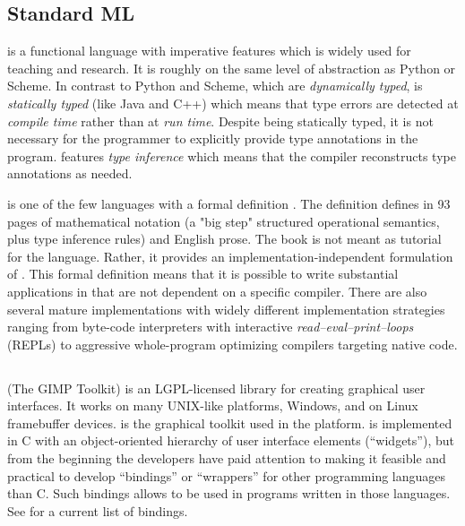 \documentclass[workingdraft]{usetex-v1}
\begin{document}
\subsection{Standard ML}


\sml is a functional language with imperative features which is
widely used for teaching and research.  It is roughly on the same
level of abstraction as Python or Scheme. In contrast to Python and
Scheme, which are \emph{dynamically typed}, \sml is \emph{statically
  typed} (like Java and C++) which means that type errors are detected
at \emph{compile time} rather than at \emph{run time}.  Despite \sml
being statically typed, it is not necessary for the programmer to
explicitly provide type annotations in the program. \sml features
\emph{type inference} which means that the compiler reconstructs type
annotations as needed.

\sml is one of the few languages with a formal definition
\cite{Milner:1997:Definition}.  The definition defines \sml in 93
pages of mathematical notation (a "big step" structured operational
semantics, plus type inference rules) and English prose.  The book is
not meant as tutorial for the language. Rather, it provides an
implementation-independent formulation of \sml.  This formal
definition means that it is possible to write substantial applications
in \sml that are not dependent on a specific compiler.  There are also
several mature \sml implementations with widely different
implementation strategies ranging from byte-code interpreters with
interactive \emph{read--eval--print--loops} (REPLs) to aggressive
whole-program optimizing compilers targeting native code.




\subsection{\gtk}
\label{sec:gtk}


\gtk (The GIMP Toolkit) \cite{Gtk-webpage:2004} is an LGPL-licensed
\cite{LGPL:1999} library for creating graphical
user interfaces.  It works on many UNIX-like platforms, Windows, and
on Linux framebuffer devices.  \gtk is the graphical toolkit used in
the \gnome platform. \gtk is implemented in C with an object-oriented
hierarchy of user interface elements (``widgets''), but from the beginning
the \gtk developers have paid attention to making it feasible and
practical to develop ``bindings'' or ``wrappers'' for
other programming languages than C.  Such bindings allows \gtk to be
used in programs written in those languages. See
\cite{Gtk-bindings-webpage:2004} for a current list of bindings.
\end{document}
